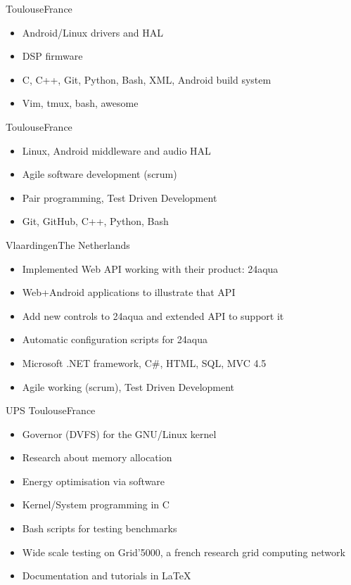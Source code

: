 \documentclass[a4paper,11pt]{moderncv}
\begin{document}
{Toulouse}{France}
{
    \begin{itemize}
        \item Android/Linux drivers and HAL
        \item DSP firmware
        \item C, C++, Git, Python, Bash, XML, Android build system
        \item Vim, tmux, bash, awesome
    \end{itemize}
}

{Toulouse}{France}
{
    \begin{itemize}
        \item Linux, Android middleware and audio HAL
        \item Agile software development (scrum)
        \item Pair programming, Test Driven Development
        \item Git, GitHub, C++, Python, Bash
    \end{itemize}
}

{Vlaardingen}{The Netherlands}
{
    \begin{itemize}
        \item Implemented Web API working with their product: 24aqua
        \item Web+Android applications to illustrate that API
        \item Add new controls to 24aqua and extended API to support it
        \item Automatic configuration scripts for 24aqua
        \item Microsoft .NET framework, C\#, HTML, SQL, MVC 4.5
        \item Agile working (scrum), Test Driven Development
    \end{itemize}
}

{UPS Toulouse}{France}
{
    \begin{itemize}
        \item Governor (DVFS) for the GNU/Linux kernel
        \item Research about memory allocation
        \item Energy optimisation via software
        \item Kernel/System programming in C
        \item Bash scripts for testing benchmarks
        \item Wide scale testing on Grid'5000, a french research grid computing network
        \item Documentation and tutorials in \LaTeX
    \end{itemize}
}
\end{document}
